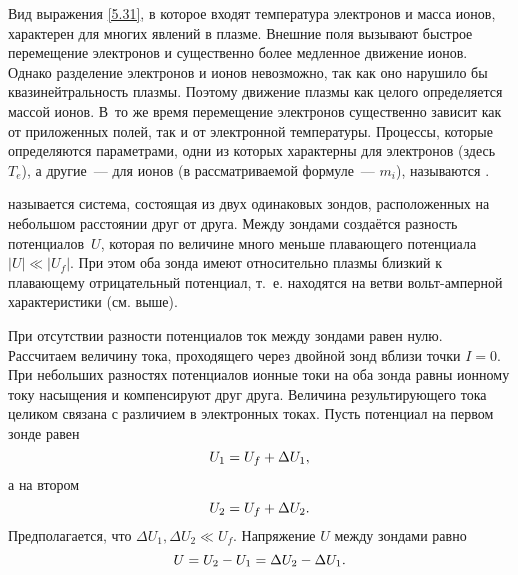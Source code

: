 \begin{lab:note}
Вид выражения \eqref{5.31}, в которое входят температура электронов и масса
ионов, характерен для многих явлений в плазме.
Внешние поля вызывают быстрое перемещение электронов и существенно более
медленное движение ионов. Однако разделение электронов и ионов невозможно,
так как оно нарушило бы квазинейтральность плазмы.
Поэтому движение плазмы как целого определяется массой ионов. 
В~то же время перемещение электронов существенно зависит как от
приложенных полей, так и от электронной температуры. Процессы, которые
определяются параметрами, одни из которых
характерны для электронов (здесь~$T_e$), а другие~--- для ионов (в
рассматриваемой формуле~--- $m_i$), называются .
\end{lab:note}


\label{sec:double}

 называется система, состоящая из двух одинаковых зондов,
расположенных на небольшом расстоянии друг от
друга. Между зондами создаётся разность потенциалов~$U$, которая по величине много
меньше плавающего потенциала $|U|\ll |U_f|$. При
этом оба зонда имеют относительно плазмы близкий к плавающему отрицательный
потенциал, т.~е. находятся на  ветви
вольт-амперной характеристики (см. выше).

При отсутствии разности потенциалов ток между зондами равен нулю. Рассчитаем
величину тока, проходящего через двойной
зонд вблизи точки $I=0$. При небольших разностях потенциалов ионные токи на оба
зонда равны ионному току насыщения и
компенсируют друг друга. Величина результирующего тока целиком связана с
различием в электронных токах. Пусть потенциал
на первом зонде равен
\begin{equation*}
	\eqmark{5.32}
	U_1=U_f+\Delta U_1,
\end{equation*}
а на втором
\begin{equation*}
	\eqmark{5.33}
	U_2=U_f+\Delta U_2.
\end{equation*}
Предполагается, что $\Delta U_1, \Delta U_2 \ll U_f$.
Напряжение $U$ между зондами равно
\begin{equation*}
	\eqmark{5.34}
	U=U_2-U_1=\Delta U_2-\Delta U_1.
\end{equation*}

